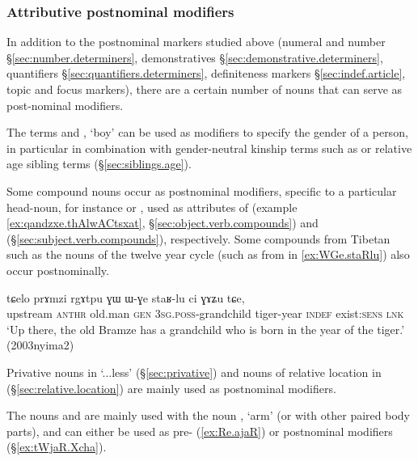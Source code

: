 \subsubsection{Attributive postnominal modifiers} \label{ex:attributive.postnominal}
In addition to the postnominal markers studied above (numeral and number §\ref{sec:number.determiners}, demonstratives §\ref{sec:demonstrative.determiners}, quantifiers §\ref{sec:quantifiers.determiners}, definiteness markers §\ref{sec:indef.article}, topic and focus markers), there are a certain number of nouns that can serve as post-nominal modifiers.

The terms  and , `boy' can be used as modifiers to specify the gender of a person, in particular in combination with gender-neutral kinship terms such as  or relative age sibling terms (§\ref{sec:siblings.age}).

Some compound nouns occur as postnominal modifiers, specific to a particular head-noun, for instance  or , used as attributes of   (example \ref{ex:qandzxe.thAlwACtsxat}, §\ref{sec:object.verb.compounds}) and  (§\ref{sec:subject.verb.compounds}), respectively.  Some compounds from Tibetan such as the nouns of the twelve year cycle (such as  from  in \ref{ex:WGe.staRlu}) also occur postnominally.

\begin{exe}
\ex \label{ex:WGe.staRlu}
\gll tɕelo prɤmzi rgɤtpu ɣɯ ɯ-ɣe staʁ-lu ci ɣɤʑu tɕe, \\
upstream  \textsc{anthr} old.man \textsc{gen} \textsc{3sg}.\textsc{poss}-grandchild tiger-year \textsc{indef} exist:\textsc{sens} \textsc{lnk} \\
\glt `Up there, the old Bramze has a grandchild who is born in the year of the tiger.' (2003nyima2)
\end{exe}

Privative nouns in  `...less' (§\ref{sec:privative}) and nouns of relative location in  (§\ref{sec:relative.location}) are mainly used as postnominal modifiers.

The nouns  and  are mainly used with the noun , `arm' (or with other paired body parts), and can either be used as pre- (\ref{ex:Re.ajaR}) or postnominal modifiers (§\ref{ex:tWjaR.Xcha}).

